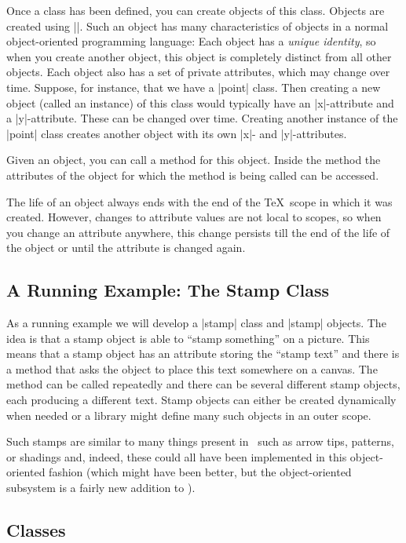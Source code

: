Once a class has been defined, you can create objects of this class. Objects
are created using |\pgfoonew|. Such an object has many characteristics of
objects in a normal object-oriented programming language: Each object has a
\emph{unique identity}, so when you create another object, this object is
completely distinct from all other objects. Each object also has a set of
private attributes, which may change over time. Suppose, for instance, that we
have a |point| class. Then creating a new object (called an instance) of this
class would typically have an |x|-attribute and a |y|-attribute. These can be
changed over time. Creating another instance of the |point| class creates
another object with its own |x|- and |y|-attributes.

Given an object, you can call a method for this object. Inside the method the
attributes of the object for which the method is being called can be accessed.

The life of an object always ends with the end of the \TeX\ scope in which it
was created. However, changes to attribute values are not local to scopes, so
when you change an attribute anywhere, this change persists till the end of the
life of the object or until the attribute is changed again.


\subsection{A Running Example: The Stamp Class}

As a running example we will develop a |stamp| class and |stamp| objects. The
idea is that a stamp object is able to ``stamp something'' on a picture. This
means that a stamp object has an attribute storing the ``stamp text'' and there
is a method that asks the object to place this text somewhere on a canvas. The
method can be called repeatedly and there can be several different stamp
objects, each producing a different text. Stamp objects can either be created
dynamically when needed or a library might define many such objects in an outer
scope.

Such stamps are similar to many things present in \pgfname\ such as arrow tips,
patterns, or shadings and, indeed, these could all have been implemented in
this object-oriented fashion (which might have been better, but the
object-oriented subsystem is a fairly new addition to \pgfname).


\subsection{Classes}

